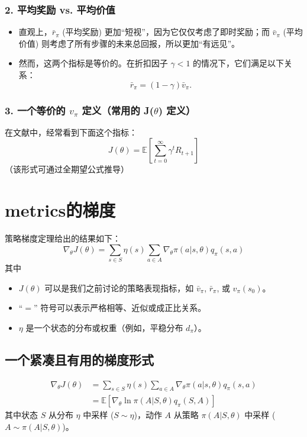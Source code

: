 \documentclass{article}
\begin{document}
\subsubsection*{2. 平均奖励 vs. 平均价值}
\begin{itemize}
    \item 直观上，$\bar{r}_{\pi}$ (平均奖励) 更加“短视”，因为它仅仅考虑了即时奖励；而 $\bar{v}_{\pi}$ (平均价值) 则考虑了所有步骤的未来总回报，所以更加“有远见”。
    \item 然而，这两个指标是等价的。在折扣因子 $\gamma < 1$ 的情况下，它们满足以下关系：
    \[
    \bar{r}_{\pi} = (1 - \gamma)\bar{v}_{\pi}.
    \]
\end{itemize}

\subsubsection*{3. 一个等价的 $v_{\pi}$ 定义（常用的 J($\theta$) 定义）}
在文献中，经常看到下面这个指标：
\[
J(\theta) = \mathbb{E}\left[\sum_{t=0}^{\infty} \gamma^t R_{t+1}\right]
\]
（该形式可通过全期望公式推导）
\section{metrics的梯度}
策略梯度定理给出的结果如下：
\[
\nabla_{\theta} J(\theta) = \sum_{s \in S} \eta(s) \sum_{a \in A} \nabla_{\theta} \pi(a|s, \theta) q_{\pi}(s, a)
\]
其中
\begin{itemize}
    \item $J(\theta)$ 可以是我们之前讨论的策略表现指标，如 $\bar{v}_{\pi}$, $\bar{r}_{\pi}$, 或 $v_{\pi}(s_0)$。
    \item “$=$” 符号可以表示严格相等、近似或成正比关系。
    \item $\eta$ 是一个状态的分布或权重（例如，平稳分布 $d_{\pi}$）。
\end{itemize}
\subsection*{一个紧凑且有用的梯度形式}

\begin{align*}
    \nabla_{\theta} J(\theta) &= \sum_{s \in S} \eta(s) \sum_{a \in A} \nabla_{\theta} \pi(a|s, \theta) q_{\pi}(s, a) \\
    &= \mathbb{E}[\nabla_{\theta} \ln \pi(A|S, \theta) q_{\pi}(S, A)]
\end{align*}
其中状态 $S$ 从分布 $\eta$ 中采样 ($S \sim \eta$)，动作 $A$ 从策略 $\pi(A|S, \theta)$ 中采样 ($A \sim \pi(A|S, \theta)$)。
\end{document}
